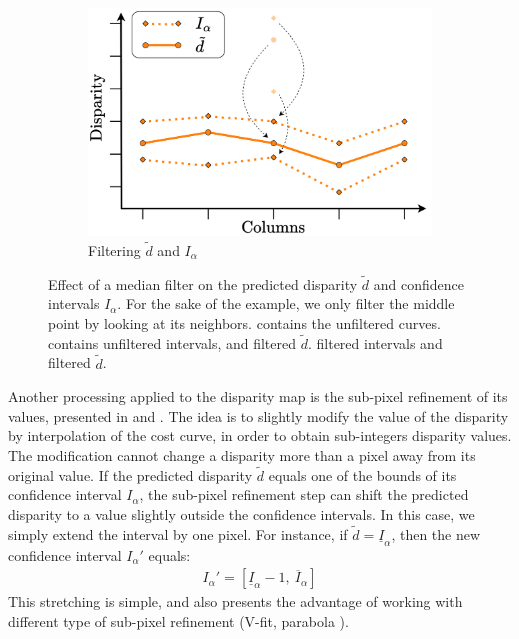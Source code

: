 \begin{figure}
\begin{subfigure}[t]{0.32\linewidth}
        \includegraphics[width=\linewidth]{Images/Chap_5/Median_filtering_3.png}
        \caption{Filtering $\tilde{d}$ and $I_\alpha$}
        \label{fig:median_filtering_3}
    \end{subfigure}
    \caption{Effect of a median filter on the predicted disparity $\tilde{d}$ and confidence intervals $I_\alpha$. For the sake of the example, we only filter the middle point by looking at its neighbors.  contains the unfiltered curves.  contains unfiltered intervals, and filtered $\tilde{d}$.  filtered intervals and filtered $\tilde{d}$.}
    \label{fig:median_filtering}
\end{figure}

Another processing applied to the disparity map is the sub-pixel refinement of its values, presented in  and . The idea is to slightly modify the value of the disparity by interpolation of the cost curve, in order to obtain sub-integers disparity values. The modification cannot change a disparity more than a pixel away from its original value. If the predicted disparity $\tilde{d}$ equals one of the bounds of its confidence interval $I_\alpha$, the sub-pixel refinement step can shift the predicted disparity to a value slightly outside the confidence intervals. In this case, we simply extend the interval by one pixel. For instance, if $\tilde{d}=\underline{I}_\alpha$, then the new confidence interval $I_\alpha'$ equals:
\begin{align}\label{eq:subpixel_intervals}
    I_\alpha'=[\underline{I}_\alpha-1,~\overline{I}_\alpha]
\end{align}
This stretching is simple, and also presents the advantage of working with different type of sub-pixel refinement (\ie V-fit, parabola \etc).

